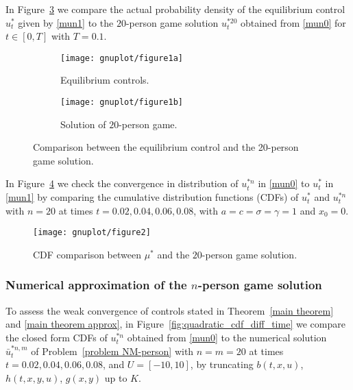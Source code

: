 \documentclass[12pt]{article}
\theoremstyle{named}
\numberwithin{equation}{section}
\begin{document}
\noindent
In Figure~\ref{fig:density_quadratic_equilibrium_20person} we compare
the actual probability density of the equilibrium control $u^*_t$ given by
\eqref{mun1} to the $20$-person game solution $u^{*20}_t$
obtained from \eqref{mun0} for $t\in [0,T]$ with $T=0.1$.

\medskip

\begin{figure}[H]
  \centering
 \begin{subfigure}[b]{0.45\textwidth}
    \texttt{[image: gnuplot/figure1a]}
    \caption{Equilibrium controls.}
    \label{fig:density_quadratic_equilibrium_20person-a}
 \end{subfigure}
  \begin{subfigure}[b]{0.45\textwidth}
    \texttt{[image: gnuplot/figure1b]}
    \caption{Solution of $20$-person game.}
    \label{fig:density_quadratic_equilibrium_20person-b}
 \end{subfigure}
    \caption{Comparison between the equilibrium control and the 20-person game solution.}
\label{fig:density_quadratic_equilibrium_20person}
\end{figure}

\noindent
 In Figure~\ref{fig:quadratic_equilibrium_20person}
 we check the convergence in distribution of $u^{*n}_t$ in
 \eqref{mun0} to $u^*_t$ in \eqref{mun1} by comparing the cumulative
 distribution functions (CDFs)
 of $u^*_t$ and $u^{*n}_t$ with $n=20$ at times $t=0.02, 0.04, 0.06, 0.08$,
 with $a=c =\sigma=\gamma=1$ and $x_0=0$.

\begin{figure}[H]
  \centering
  \texttt{[image: gnuplot/figure2]}
  \caption{CDF comparison between $\mu^*$ and the $20$-person game solution.}
  \label{fig:quadratic_equilibrium_20person}
\end{figure}

\subsubsection*{Numerical approximation of the $n$-person game solution}
\noindent
To assess the weak convergence of controls stated in Theorem~\ref{main theorem} and \ref{main theorem approx}, in Figure~\ref{fig:quadratic_cdf_diff_time}
we compare the closed form CDFs of
$u^{*n}_t$ obtained from \eqref{mun0}
to the numerical solution $\bar{u}^{*{n},{m}}_t$ of Problem~\eqref{problem NM-person}
with $n = m = 20$ at times $t =0.02, 0.04, 0.06, 0.08$,
and $U=[-10,10]$, by truncating
$b(t,x,u)$, $h(t,x,y,u)$, $g(x,y)$ up to $K$.
\end{document}
